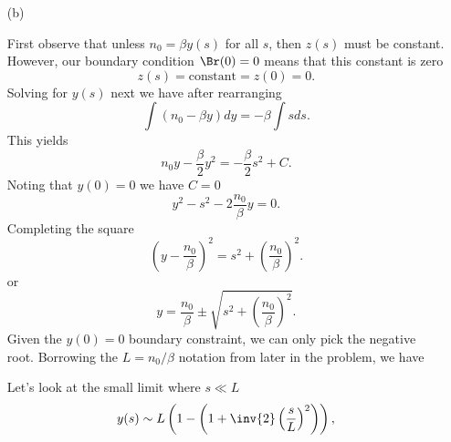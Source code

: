 {\begin{enumerate}
We have two non-trivial differential equations to solve.

\item[(b)]

First observe that unless \(n_0 = \beta y(s)\) for all \(s\), then \(z(s)\) must be constant.  However, our boundary condition \(\Br(0) = 0\) means that this constant is zero
%
\begin{equation}\label{eqn:modernOpticsProblemSet1P2:110}
z(s) = \text{constant} = z(0) = 0.
\end{equation}
%
Solving for \(y(s)\) next we have after rearranging
%
\begin{dmath}\label{eqn:modernOpticsProblemSet1P2:130}
\int \left( n_0 - \beta y \right) dy = -\beta \int s ds.
\end{dmath}
%
This yields
%
\begin{dmath}\label{eqn:modernOpticsProblemSet1P2:150}
n_0 y - \frac{\beta}{2} y^2 = -\frac{\beta}{2} s^2 + C.
\end{dmath}
%
Noting that \(y(0) = 0\) we have \(C = 0\)
%
\begin{dmath}\label{eqn:modernOpticsProblemSet1P2:170}
y^2 - s^2 - 2 \frac{n_0}{\beta} y = 0.
\end{dmath}
%
Completing the square
%
\begin{dmath}\label{eqn:modernOpticsProblemSet1P2:230}
\left( y - \frac{n_0}{\beta} \right)^2 = s^2 + \left( \frac{n_0}{\beta} \right)^2.
\end{dmath}
%
or
%
\begin{dmath}\label{eqn:modernOpticsProblemSet1P2:190}
y = \frac{n_0}{\beta} \pm \sqrt{ s^2 + \left( \frac{n_0}{\beta} \right)^2 }.
\end{dmath}
%
Given the \(y(0) = 0\) boundary constraint, we can only pick the negative root.  Borrowing the \(L = n_0/\beta\) notation from later in the problem, we have


Let's look at the small limit where \(s \ll L\)
%
\begin{dmath}\label{eqn:modernOpticsProblemSet1P2:250}
y(s)
\sim L \left( 1 - \left( 1 + \inv{2} \left(\frac{s}{L}\right)^2 \right) \right),
\end{dmath}
%


\end{enumerate}}
